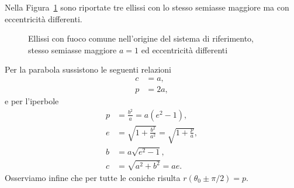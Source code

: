 Nella Figura~\ref{fig:ellissi-eccentricita} sono riportate tre ellissi con lo
stesso semiasse maggiore ma con eccentricità differenti.
\begin{figure}
  \centering
  \caption[Ellissi con diversi valori di eccentricità]{Ellissi con fuoco comune
    nell'origine del sistema di riferimento, stesso semiasse maggiore $a=1$ ed
    eccentricità differenti}
  \label{fig:ellissi-eccentricita}
\end{figure}

Per la parabola sussistono le seguenti relazioni
\begin{align}
  c &= a,\\
  p &= 2a,
\end{align}
e per l'iperbole
\begin{align}
  p &= \frac{b^2}{a} = a(e^2-1), \label{eq:semilato-iperbole}\\
  e &= \sqrt{1+\frac{b^2}{a^2}} =
  \sqrt{1+\frac{p}{a}}, \label{eq:eccentricita-iperbole}\\
  b &= a\sqrt{e^2-1}, \\
  c &= \sqrt{a^2+b^2} = ae.
\end{align}
Osserviamo infine che per tutte le coniche risulta $r(\theta_0\pm\pi/2)=p$.

